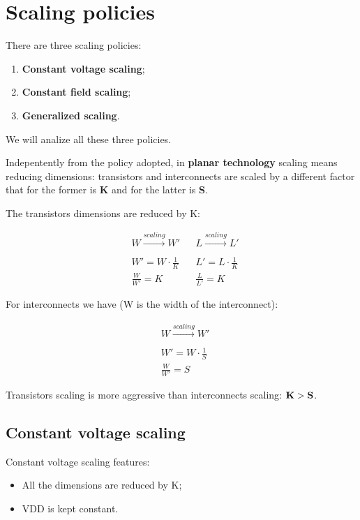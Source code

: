 \documentclass[a4paper, 12pt, twoside, openright]{report}
\begin{document}
\section{Scaling policies}

There are three scaling policies:

\begin{enumerate}
\item \textbf{Constant voltage scaling};
\item \textbf{Constant field scaling};
\item \textbf{Generalized scaling}.
\end{enumerate}

We will analize all these three policies.

Indepentently from the policy adopted, in \textbf{planar technology} scaling means reducing dimensions: transistors and interconnects are scaled by a different factor that for the former is \textbf{K} and for the latter is \textbf{S}.

The transistors dimensions are reduced by K:

\begin{align*}
&W \xrightarrow[]{scaling} W' & &L \xrightarrow[]{scaling} L' \\
&W' = W \cdot \frac{1}{K} & &L' = L \cdot \frac{1}{K}\\
&\frac{W}{W'} = K & &\frac{L}{L'} = K
\end{align*}

For interconnects we have (W is the width of the interconnect):

\begin{align*}
&W \xrightarrow[]{scaling} W'\\
&W' = W \cdot \frac{1}{S}\\
&\frac{W}{W'} = S
\end{align*}

Transistors scaling is more aggressive than interconnects scaling: $\text{\textbf{K}} > \text{\textbf{S}}$.

\subsection{Constant voltage scaling}

Constant voltage scaling features:

\begin{itemize}
\item All the dimensions are reduced by K;
\item VDD is kept constant.
\end{itemize}
\end{document}
